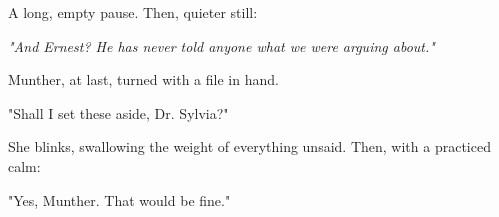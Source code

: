 A long, empty pause. Then, quieter still:
\bigskip

\textit{"And Ernest? He has never told anyone what we were arguing about."}

\bigskip

Munther, at last, turned with a file in hand.

"Shall I set these aside, Dr. Sylvia?"

\bigskip

She blinks, swallowing the weight of everything unsaid. Then, with a practiced calm:

\bigskip

"Yes, Munther. That would be fine."
  







